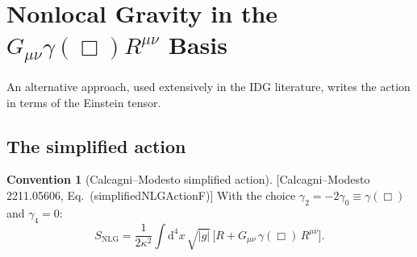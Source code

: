 \documentclass[12pt,a4paper]{article}
\theoremstyle{definition}
\newtheorem{convention}[proposition]{Convention}
\theoremstyle{remark}
\newcommand{\dd}{\mathrm{d}}
\newcommand{\fromlit}[1]{\textcolor{blue!70!black}{\textsf{[#1]}}}
\begin{document}
\section{Nonlocal Gravity in the $G_{\mu\nu}\gamma(\Box)R^{\mu\nu}$ Basis}
\label{sec:NLG-basis}

An alternative approach, used extensively in the IDG literature, writes
the action in terms of the Einstein tensor.

\subsection{The simplified action}

\begin{convention}[Calcagni--Modesto simplified action]
\label{conv:CMN-action}
\fromlit{Calcagni--Modesto 2211.05606, Eq.~(simplifiedNLGActionF)}
With the choice $\gamma_2 = -2\gamma_0 \equiv \gamma(\Box)$ and
$\gamma_4 = 0$:
\begin{equation}\label{eq:NLG-simplified}
  S_{\mathrm{NLG}} = \frac{1}{2\kappa^2}\int\dd^4 x\,\sqrt{|g|}\,
  \big[R + G_{\mu\nu}\,\gamma(\Box)\,R^{\mu\nu}\big].
\end{equation}
\end{convention}
\end{document}
